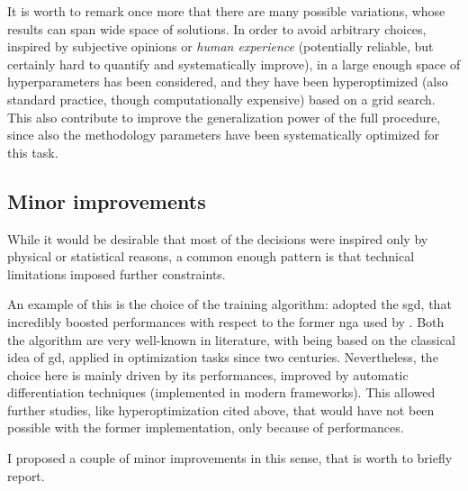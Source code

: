 It is worth to remark once more that there are many possible variations, whose
results can span wide space of solutions.
In order to avoid arbitrary choices, inspired by subjective opinions or
\textit{human experience} (potentially reliable, but certainly hard to quantify
and systematically improve), in  a large enough space of
hyperparameters has been considered, and they have been hyperoptimized (also
standard practice, though computationally expensive) based on a grid search.
%
This also contribute to improve the generalization power of the full procedure,
since also the methodology parameters have been systematically optimized for
this task.

\subsection{Minor improvements}

While it would be desirable that most of the decisions were inspired only by
physical or statistical reasons, a common enough pattern is that technical
limitations imposed further constraints.

An example of this is the choice of the training algorithm: 
adopted the \acrfull{sgd}, that incredibly boosted performances with respect to
the former \acrfull{nga} used by .
Both the algorithm are very well-known in literature, with \sgd being based on
the classical idea of \acrfull{gd}, applied in optimization tasks since two
centuries.
%
Nevertheless, the choice here is mainly driven by its performances, improved by
automatic differentiation techniques (implemented in modern frameworks).
This allowed further studies, like hyperoptimization cited above, that would
have not been possible with the former \nga implementation, only because of
performances.

I proposed a couple of minor improvements in this sense, that is worth to
briefly report.

